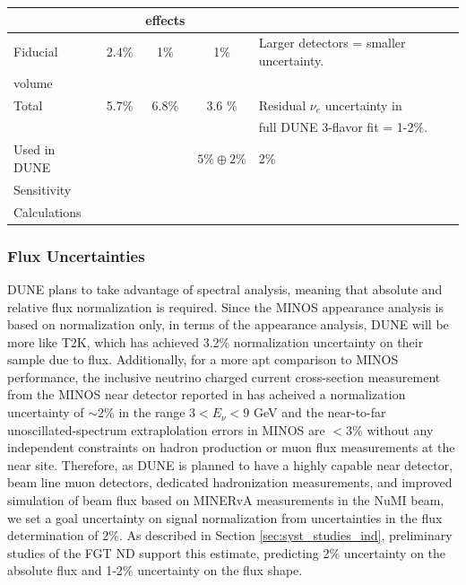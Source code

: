 \begin{table}[!hb]
\begin{center}
\begin{tabular}{|l|c|c|c|l|}
 & & effects & & \\ \hline 
Fiducial & 2.4\% & 1\% & 1\% & Larger detectors = smaller uncertainty. \\ 
volume & & & & \\ \hline\hline
Total  & 5.7\% & 6.8\% & 3.6 \% & Residual $\nu_e$ uncertainty in  \\ 
& & & & full DUNE 3-flavor fit = 1-2\%. \\ \hline\hline
Used in DUNE & & & $5\% \oplus 2\%$ & 2\% \\
Sensitivity & & & & \\
Calculations & & & & \\ \hline \hline
\end{tabular}
\end{center}
\end{table}

\subsubsection{Flux Uncertainties}
\label{sec:syst_just_flux}
DUNE plans to take advantage of spectral analysis,
meaning that absolute and relative flux normalization is required. Since the MINOS \nue appearance analysis
is based on normalization only, in terms of the \nue appearance analysis, DUNE will be more like T2K,
which has achieved 3.2\% normalization uncertainty on their \nue sample due to flux. Additionally, for a more apt
comparison to MINOS performance, the inclusive neutrino charged current cross-section measurement from the MINOS
near detector reported in \cite{xxx} has acheived a normalization uncertainty of $\sim$2\% in the
range $3 < E_\nu < 9$ GeV and the near-to-far \numu unoscillated-spectrum extraplolation errors in MINOS
are $<$3\% without any independent constraints on hadron production or muon flux measurements at the near
site. Therefore, as DUNE is planned to have a highly capable near detector, beam line
muon detectors, dedicated hadronization measurements, and improved simulation of beam flux based on MINERvA
measurements in the NuMI beam, we set a goal uncertainty on \nue signal
normalization from uncertainties in the flux determination of 2\%.
As described in Section \ref{sec:syst_studies_ind}, preliminary
studies of the FGT ND support this estimate, predicting 2\% uncertainty on the absolute flux and 1-2\%
uncertainty on the flux shape.
